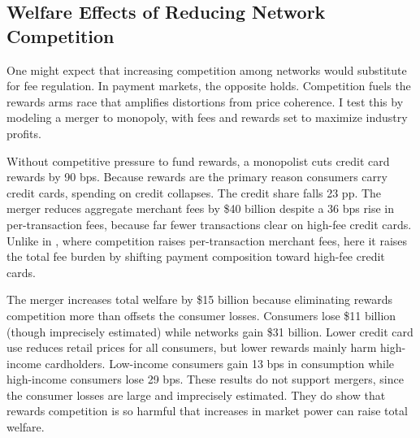 \documentclass[main.tex]{subfiles}
\begin{document}
\subsection{Welfare Effects of Reducing Network Competition}
\label{subsec:competition}

One might expect that increasing competition among networks would substitute for fee regulation.
In payment markets, the opposite holds.
Competition fuels the rewards arms race that amplifies distortions from price coherence.
I test this by modeling a merger to monopoly, with fees and rewards set to maximize industry profits.

Without competitive pressure to fund rewards, a monopolist cuts credit card rewards by 90 bps.
Because rewards are the primary reason consumers carry credit cards, spending on credit collapses. The credit share falls 23 pp.
The merger reduces aggregate merchant fees by \$40 billion despite a 36 bps rise in per-transaction fees, because far fewer transactions clear on high-fee credit cards.
Unlike in \textcite{Armstrong2006}, where competition raises per-transaction merchant fees, here it raises the total fee burden by shifting payment composition toward high-fee credit cards.

The merger increases total welfare by \$15 billion because eliminating rewards competition more than offsets the consumer losses.
Consumers lose \$11 billion (though imprecisely estimated)
while networks gain \$31 billion.
Lower credit card use reduces retail prices for all consumers, but lower rewards mainly harm high-income cardholders.
Low-income consumers gain 13 bps in consumption
while high-income consumers lose 29 bps.
These results do not support mergers, since the consumer losses are large and imprecisely estimated.
They do show that rewards competition is so harmful that increases in market power can raise total welfare.
\end{document}
